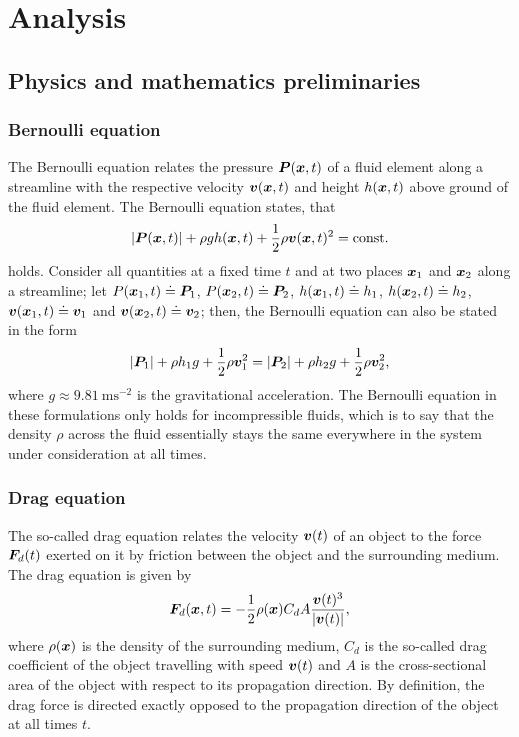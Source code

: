 \documentclass[a4paper,11pt]{report}
\begin{document}
\chapter{Analysis}
\section{Physics and mathematics preliminaries}
\subsection{Bernoulli equation}
The Bernoulli equation relates the pressure $\bm{P}(\bm{x},t)$ of a fluid element along a streamline with the respective velocity $\bm{v}(\bm{x},t)$ and height $h(\bm{x},t)$ above ground of the fluid element. The Bernoulli equation states, that \begin{equation}
|\bm{P}(\bm{x},t)| + \rho g h(\bm{x},t) + \frac{1}{2}\rho \bm{v}(\bm{x},t)^2 = \text{const.}
\end{equation} holds. Consider all quantities at a fixed time $t$ and at two places $\bm{x}_1$ and $\bm{x}_2$ along a streamline; let $P(\bm{x}_1,t) \doteq \bm{P}_1$, $P(\bm{x}_2,t) \doteq \bm{P}_2$, $h(\bm{x}_1,t) \doteq h_1$, $h(\bm{x}_2,t) \doteq h_2$, $\bm{v}(\bm{x}_1,t) \doteq \bm{v}_1$ and $\bm{v}(\bm{x}_2,t) \doteq \bm{v}_2$; then, the Bernoulli equation can also be stated in the form
\begin{equation}
|\bm{P}_1| + \rho h_1 g + \frac{1}{2}\rho \bm{v}_1^2 = |\bm{P}_2| + \rho h_2 g + \frac{1}{2}\rho \bm{v}_2^2,
\end{equation} where $g \approx \SI{9.81}{\meter\second^{-2}}$ is the gravitational acceleration. The Bernoulli equation in these formulations only holds for incompressible fluids, which is to say that the density $\rho$ across the fluid essentially stays the same everywhere in the system under consideration at all times.

\subsection{Drag equation}
The so-called drag equation relates the velocity $\bm{v}(t)$ of an object to the force $\bm{F}_d(t)$ exerted on it by friction between the object and the surrounding medium. The drag equation is given by \begin{equation}
\bm{F}_d(\bm{x},t) = -\frac{1}{2}\rho(\bm{x}) C_d A\frac{\bm{v}(t)^3}{|\bm{v}(t)|}, 
\end{equation} where $\rho(\bm{x})$ is the density of the surrounding medium, $C_d$ is the so-called drag coefficient of the object travelling with speed $\bm{v}(t)$ and $A$ is the cross-sectional area of the object with respect to its propagation direction. By definition, the drag force is directed exactly opposed to the propagation direction of the object at all times $t$.
\end{document}
